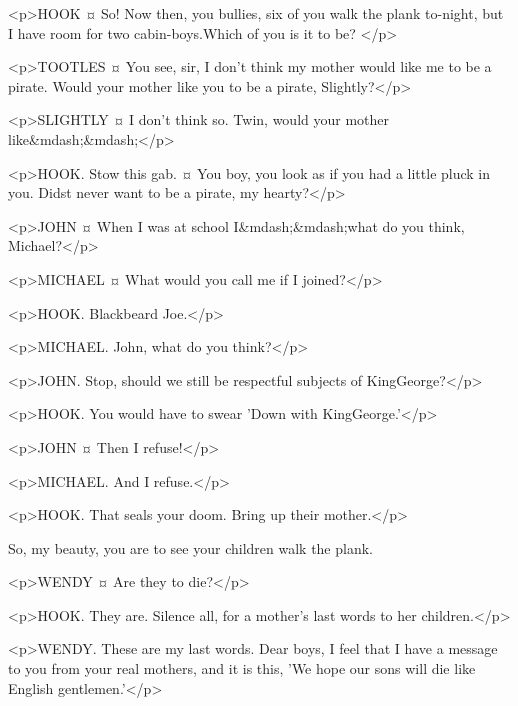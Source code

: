 <p>HOOK ¤
So! Now then, you bullies, six of you walk the plank to-night, but I have room for two cabin-boys.Which of you is it to be?
</p>

<p>TOOTLES ¤
You see, sir, I don't think my mother would like me to be a pirate. Would your mother like you to be a pirate, Slightly?</p>

<p>SLIGHTLY ¤
I don't think so. Twin, would your mother like&mdash;&mdash;</p>

<p>HOOK. Stow this gab.
¤
You boy, you look as if you had a little pluck in you. Didst never want to be a pirate, my hearty?</p>

<p>JOHN ¤
When I was at school I&mdash;&mdash;what do you think, Michael?</p>

<p>MICHAEL ¤
What would you call me if I joined?</p>

<p>HOOK. Blackbeard Joe.</p>

<p>MICHAEL. John, what do you think?</p>

<p>JOHN. Stop, should we still be respectful subjects of KingGeorge?</p>

<p>HOOK. You would have to swear 'Down with KingGeorge.'</p>

<p>JOHN ¤
Then I refuse!</p>

<p>MICHAEL. And I refuse.</p>

<p>HOOK. That seals your doom. Bring up their mother.</p>


So, my beauty, you are to see your children walk the plank. 

<p>WENDY ¤
Are they to die?</p>

<p>HOOK. They are. Silence all, for a mother's last words to her children.</p>

<p>WENDY. These are my last words. Dear boys, I feel that I have a message to you from your real mothers, and it is this, 'We hope our sons will die like English gentlemen.'</p>


